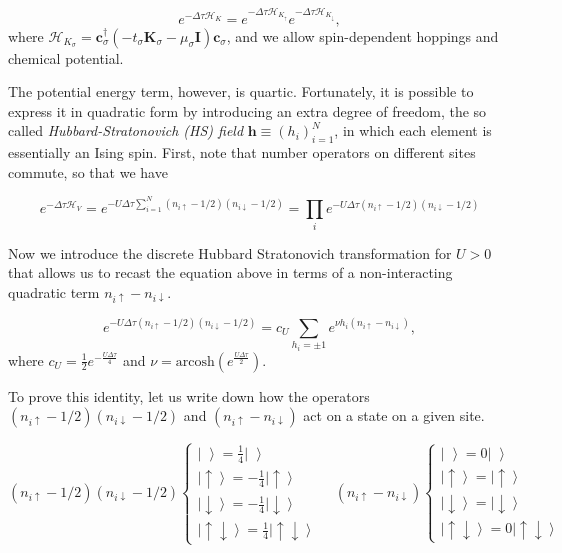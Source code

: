 \begin{equation}
e^{-\Delta\tau \mathcal{H}_K} = e^{-\Delta\tau \mathcal{H}_{K_\uparrow}} e^{-\Delta\tau \mathcal{H}_{K_\downarrow}} ,
\end{equation}
where $\mathcal{H}_{K_\sigma} = \bm c_\sigma^\dagger (-t_\sigma \bm K_\sigma - \mu_\sigma \bm I )  \bm c_\sigma$, and we allow spin-dependent hoppings and chemical potential.

The potential energy term, however, is quartic.
Fortunately, it is possible to express it in quadratic form by introducing an extra degree of freedom, the so called \emph{Hubbard-Stratonovich (HS) field} $\bm h \equiv (h_i)_{i=1}^N$, in which each element is essentially an Ising spin.
First, note that number operators on different sites commute, so that we have

\begin{equation}
e^{-\Delta\tau \mathcal{H}_V} = e^{-U \Delta\tau \sum_{i=1}^N (n_{i\uparrow} - 1/2 ) (n_{i\downarrow} - 1/2 )} = \prod_i e^{-U \Delta\tau (n_{i\uparrow} - 1/2 ) (n_{i\downarrow} - 1/2 )}
\end{equation}

Now we introduce the discrete Hubbard Stratonovich transformation for $U > 0$ that allows us to recast the equation above in terms of a non-interacting quadratic term $n_{i\uparrow} - n_{i\downarrow} $.

\begin{equation}\label{eq:discreteHS}
e^{-U \Delta\tau (n_{i\uparrow} - 1/2 ) (n_{i\downarrow} - 1/2 )} = c_U \sum_{h_i = \pm 1} e^{\nu h_i (n_{i\uparrow} - n_{i\downarrow} )},
\end{equation}
where $c_U = \frac{1}{2} e^{-\frac{U\Delta \tau}{4}}$ and $\nu = \text{arcosh} ( e^{\frac{U\Delta\tau}{2}})$.

To prove this identity, let us write down how the operators  $(n_{i\uparrow} - 1/2 ) (n_{i\downarrow} - 1/2 )$ and $(n_{i\uparrow} - n_{i\downarrow} )$ act on a state on a given site.

\begin{equation}
(n_{i\uparrow} - 1/2 ) (n_{i\downarrow} - 1/2 )
\begin{cases}
\left| \, \, \right\rangle = \frac{1}{4} \left| \, \, \right\rangle \\
\left| \uparrow \right\rangle = -\frac{1}{4} \left| \uparrow \right\rangle \\
\left| \downarrow \right\rangle = -\frac{1}{4} \left| \downarrow \right\rangle \\
\left| \uparrow \downarrow \right\rangle = \frac{1}{4} \left| \uparrow \downarrow \right\rangle
\end{cases} \quad
(n_{i\uparrow} - n_{i\downarrow} )
\begin{cases}
\left| \, \, \right\rangle = 0\left| \, \, \right\rangle \\
\left| \uparrow \right\rangle = \left| \uparrow \right\rangle \\
\left| \downarrow \right\rangle = \left| \downarrow \right\rangle \\
\left| \uparrow \downarrow \right\rangle = 0 \left| \uparrow \downarrow \right\rangle
\end{cases}
\end{equation}


